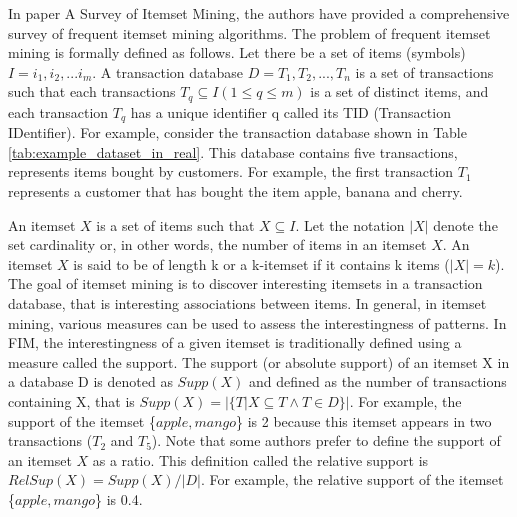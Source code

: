 In paper A Survey of Itemset Mining\cite{survey_itemset_mining}, the authors have provided a comprehensive survey of frequent itemset mining algorithms.
The problem of frequent itemset mining is formally defined as follows.
Let there be a set of items (symbols) $I = {i_1, i_2, . . . i_m}$.
A transaction database $D = {T_1, T_2, . . ., T_n}$ is a set
of transactions such that each transactions $T_q \subseteq I(1 \leq q \leq m)$ is a set of distinct items,
and each transaction $T_q$ has a unique identifier q called its TID (Transaction IDentifier).
For example, consider the transaction database shown in Table \ref{tab:example_dataset_in_real}.
This database contains
five transactions, represents items bought by customers.
For example, the first transaction $T_1$ represents a customer that has bought the item apple, banana and cherry.

An itemset $X$ is a set of items such that $X \subseteq I$. Let the notation $|X|$ denote the set
cardinality or, in other words, the number of items in an itemset $X$. An itemset $X$ is said
to be of length k or a k-itemset if it contains k items ($|X| = k$).
The goal of itemset mining is to discover interesting itemsets in a transaction database,
that is interesting associations between items.
In general, in itemset mining, various measures can be used to assess the
interestingness of patterns. In FIM, the interestingness of a given itemset is traditionally
defined using a measure called the support. The support (or absolute support) of an itemset
X in a database D is denoted as $Supp(X)$ and defined as the number of transactions containing
X, that is $Supp(X) = |\{T|X \subseteq T \wedge T \in D\}|$.
For example, the support of the itemset \{$apple, mango$\} is 2 because this itemset appears in two transactions ($T_2$ and $T_5$).
Note that some authors prefer to define the support of an itemset $X$ as a ratio. This definition called the relative
support is $RelSup(X) = Supp(X)/|D|$. For example, the relative support of the itemset \{$apple, mango$\}
is 0.4.

